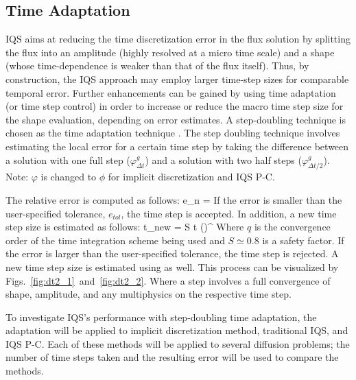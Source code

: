 \subsection{Time Adaptation}

IQS aims at reducing the time discretization error in the flux solution by splitting the flux into an amplitude (highly resolved at a micro time scale) and a shape (whose time-dependence is weaker than that of the flux itself). Thus, by construction, the IQS approach may employ larger time-step sizes for comparable temporal error. Further enhancements can be gained by using time adaptation (or time step control) in order to increase or reduce the macro time step size for the shape evaluation, depending on error estimates. A step-doubling technique is chosen as the time adaptation technique \cite{NumC}. The step doubling technique involves estimating the local error for a certain time step by taking the difference between a solution with one full step ($\varphi^g_{\Delta t}$) and a solution with two half steps ($\varphi^g_{\Delta t/2}$). Note: $\varphi$ is changed to $\phi$ for implicit discretization and IQS P-C.

The relative error is computed as follows:
\be
e_n = 
\label{eq:edt2}
\ee
If the error is smaller than the user-specified tolerance, $e_{tol}$, the time step is accepted. In addition, a new time step size is estimated as follows:
\be
\Delta t_{new} = S \Delta t \left(\right)^{}
\label{eq:dt2}
\ee
Where $q$ is the convergence order of the time integration scheme being used and $S\simeq 0.8$ is a safety factor. If the error is larger than the user-specified tolerance, the time step is rejected. A new time step size is estimated using   as well. This process can be visualized by Figs.~\ref{fig:dt2_1}~and~\ref{fig:dt2_2}.  Where a step involves a full convergence of shape, amplitude, and any multiphysics on the respective time step.

To investigate IQS's performance with step-doubling time adaptation, the adaptation will be applied to implicit discretization method, traditional IQS, and IQS P-C.  Each of these methods will be applied to several diffusion problems; the number of time steps taken and the resulting error will be used to compare the methods.

